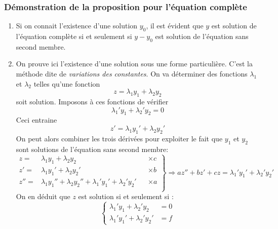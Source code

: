 \subsubsection{Démonstration de la proposition pour l'équation complète}
\begin{demo}
 \begin{enumerate}
  \item Si on connait l'existence d'une solution $y_0$, il est évident que $y$ est solution de l'équation complète si et seulement si $y-y_0$ est solution de l'équation sans second membre.
  \item {} On prouve ici l'existence d'une solution sous une forme particulière. C'est la méthode dite de \emph{variations des constantes}. On va déterminer des fonctions $\lambda_1$ et $\lambda_2$ telles qu'une fonction
\begin{displaymath}
 z = \lambda_1y_1 + \lambda_2y_2 
\end{displaymath}
soit solution.\newline
Imposons à ces fonctions de vérifier 
\begin{displaymath}
 \lambda_1'y_1 + \lambda_2'y_2 = 0
\end{displaymath}
Ceci entraine
\begin{displaymath}
 z' = \lambda_1y_1' + \lambda_2y_2' 
\end{displaymath}
On peut alors combiner les trois dérivées pour exploiter le fait que $y_1$ et $y_2$ sont solutions de l'équation sans second membre:
\begin{displaymath}
 \left. 
\begin{aligned}
z =& \lambda_1y_1 + \lambda_2y_2 & &\times c\\
z' =& \lambda_1y_1' + \lambda_2y_2' & &\times b\\
z'' =& \lambda_1y_1'' + \lambda_2y_2'' + \lambda_1'y_1' + \lambda_2'y_2' & &\times a\\
\end{aligned}
\right\rbrace 
\Rightarrow
az''+bz'+cz = \lambda_1'y_1' + \lambda_2'y_2'
\end{displaymath}
On en déduit que $z$ est solution si et seulement si :
\begin{displaymath}
 \left\lbrace 
\begin{aligned}
 \lambda_1'y_1 + \lambda_2'y_2 &= 0 \\
 \lambda_1'y_1' + \lambda_2'y_2' &= f
\end{aligned}
\right. 
\end{displaymath}

\end{enumerate}
\end{demo}
